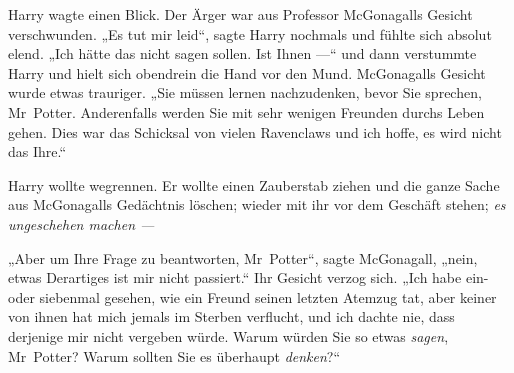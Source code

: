 Harry wagte einen Blick. Der Ärger war aus Professor McGonagalls Gesicht verschwunden.
„Es tut mir leid“, sagte Harry nochmals und fühlte sich absolut elend.
„Ich hätte das nicht sagen sollen. Ist Ihnen —“ und dann verstummte Harry und hielt sich obendrein die Hand vor den Mund. McGonagalls Gesicht wurde etwas trauriger.
„Sie müssen lernen nachzudenken, bevor Sie sprechen, Mr~Potter. Anderenfalls werden Sie mit sehr wenigen Freunden durchs Leben gehen. Dies war das Schicksal von vielen Ravenclaws und ich hoffe, es wird nicht das Ihre.“

Harry wollte wegrennen. Er wollte einen Zauberstab ziehen und die ganze Sache aus McGonagalls Gedächtnis löschen; wieder mit ihr vor dem Geschäft stehen; \emph{es ungeschehen machen —}

„Aber um Ihre Frage zu beantworten, Mr~Potter“, sagte McGonagall, „nein, etwas Derartiges ist mir nicht passiert.“ Ihr Gesicht verzog sich.
„Ich habe ein- oder siebenmal gesehen, wie ein Freund seinen letzten Atemzug tat, aber keiner von ihnen hat mich jemals im Sterben verflucht, und ich dachte nie, dass derjenige mir nicht vergeben würde. Warum würden Sie so etwas \emph{sagen}, Mr~Potter? Warum sollten Sie es überhaupt \emph{denken}?“

